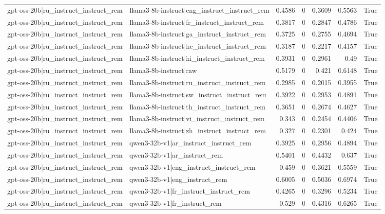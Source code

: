 \begin{table}
\begin{tabular}{l l r r r r l}
gpt-oss-20b|ru_instruct_instruct_rem & llama3-8b-instruct|eng_instruct_instruct_rem & 0.4586 & 0 & 0.3609 & 0.5563 & True \\
gpt-oss-20b|ru_instruct_instruct_rem & llama3-8b-instruct|fr_instruct_instruct_rem & 0.3817 & 0 & 0.2847 & 0.4786 & True \\
gpt-oss-20b|ru_instruct_instruct_rem & llama3-8b-instruct|ga_instruct_instruct_rem & 0.3725 & 0 & 0.2755 & 0.4694 & True \\
gpt-oss-20b|ru_instruct_instruct_rem & llama3-8b-instruct|he_instruct_instruct_rem & 0.3187 & 0 & 0.2217 & 0.4157 & True \\
gpt-oss-20b|ru_instruct_instruct_rem & llama3-8b-instruct|hi_instruct_instruct_rem & 0.3931 & 0 & 0.2961 & 0.49 & True \\
gpt-oss-20b|ru_instruct_instruct_rem & llama3-8b-instruct|raw & 0.5179 & 0 & 0.421 & 0.6148 & True \\
gpt-oss-20b|ru_instruct_instruct_rem & llama3-8b-instruct|ru_instruct_instruct_rem & 0.2985 & 0 & 0.2015 & 0.3955 & True \\
gpt-oss-20b|ru_instruct_instruct_rem & llama3-8b-instruct|sw_instruct_instruct_rem & 0.3922 & 0 & 0.2953 & 0.4891 & True \\
gpt-oss-20b|ru_instruct_instruct_rem & llama3-8b-instruct|th_instruct_instruct_rem & 0.3651 & 0 & 0.2674 & 0.4627 & True \\
gpt-oss-20b|ru_instruct_instruct_rem & llama3-8b-instruct|vi_instruct_instruct_rem & 0.343 & 0 & 0.2454 & 0.4406 & True \\
gpt-oss-20b|ru_instruct_instruct_rem & llama3-8b-instruct|zh_instruct_instruct_rem & 0.327 & 0 & 0.2301 & 0.424 & True \\
gpt-oss-20b|ru_instruct_instruct_rem & qwen3-32b-v1|ar_instruct_instruct_rem & 0.3925 & 0 & 0.2956 & 0.4894 & True \\
gpt-oss-20b|ru_instruct_instruct_rem & qwen3-32b-v1|ar_instruct_rem & 0.5401 & 0 & 0.4432 & 0.637 & True \\
gpt-oss-20b|ru_instruct_instruct_rem & qwen3-32b-v1|eng_instruct_instruct_rem & 0.459 & 0 & 0.3621 & 0.5559 & True \\
gpt-oss-20b|ru_instruct_instruct_rem & qwen3-32b-v1|eng_instruct_rem & 0.6005 & 0 & 0.5036 & 0.6974 & True \\
gpt-oss-20b|ru_instruct_instruct_rem & qwen3-32b-v1|fr_instruct_instruct_rem & 0.4265 & 0 & 0.3296 & 0.5234 & True \\
gpt-oss-20b|ru_instruct_instruct_rem & qwen3-32b-v1|fr_instruct_rem & 0.529 & 0 & 0.4316 & 0.6265 & True \\

\end{tabular}
\end{table}
